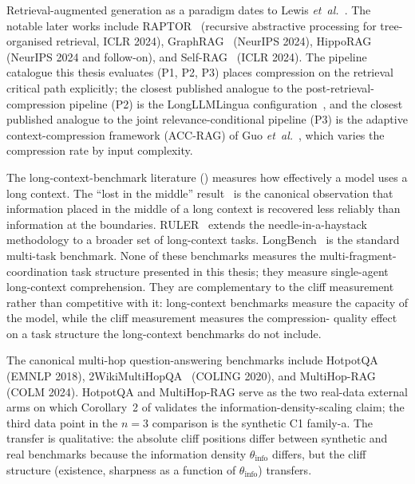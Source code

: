 Retrieval-augmented generation as a paradigm dates to Lewis
\emph{et~al.}~\cite{lewis2020rag}. The notable later works
include RAPTOR~\cite{sarthi2024raptor} (recursive abstractive
processing for tree-organised retrieval, ICLR 2024),
GraphRAG~\cite{edge2024graphrag} (NeurIPS 2024),
HippoRAG~\cite{gutierrez2024hipporag, gutierrez2025hipporag2}
(NeurIPS 2024 and follow-on), and
Self-RAG~\cite{asai2024selfrag} (ICLR 2024). The pipeline
catalogue this thesis evaluates (P1, P2, P3) places compression
on the retrieval critical path explicitly; the closest published
analogue to the post-retrieval-compression pipeline (P2) is the
LongLLMLingua configuration~\cite{jiang2024longllmlingua}, and
the closest published analogue to the joint
relevance-conditional pipeline (P3) is the adaptive
context-compression framework (ACC-RAG) of Guo
\emph{et~al.}~\cite{guo2025dynamic}, which varies the compression
rate by input complexity.

The long-context-benchmark literature
(\cite{bai2024longbench, hsieh2024ruler, liu2024lostinmiddle,
mialon2023gaia, liu2024agentbench, yen2025helmet}) measures how
effectively a model uses a long context. The
``lost in the middle'' result~\cite{liu2024lostinmiddle} is the
canonical observation that information placed in the middle of a
long context is recovered less reliably than information at the
boundaries. RULER~\cite{hsieh2024ruler} extends the
needle-in-a-haystack methodology to a broader set of long-context
tasks. LongBench~\cite{bai2024longbench} is the standard
multi-task benchmark. None of these benchmarks measures the
multi-fragment-coordination task structure presented in this thesis;
they measure single-agent long-context comprehension. They are
complementary to the cliff measurement rather than competitive
with it: long-context benchmarks measure the capacity of the
model, while the cliff measurement measures the compression-%
quality effect on a task structure the long-context benchmarks
do not include.

The canonical multi-hop question-answering benchmarks include
HotpotQA~\cite{yang2018hotpotqa} (EMNLP 2018),
2WikiMultiHopQA~\cite{ho2020wiki2hop} (COLING 2020), and
MultiHop-RAG~\cite{tang2024multihoprag} (COLM 2024).
HotpotQA and MultiHop-RAG serve as the two real-data external
arms on which Corollary~2 of  validates
the information-density-scaling claim; the third data point
in the $n{=}3$ comparison is the synthetic C1 family-a.
The transfer is qualitative: the absolute cliff positions
differ between synthetic and real benchmarks because the
information density $\theta_\text{info}$ differs, but the
cliff structure (existence, sharpness as a function of
$\theta_\text{info}$) transfers.

